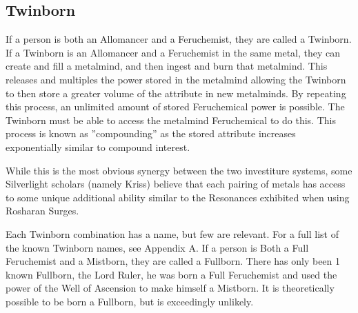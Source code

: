 \documentclass[conference]{IEEEtran}
\begin{document}
\subsection*{\textbf{Twinborn}}
If a person is both an Allomancer and a Feruchemist, they are called a Twinborn.\cite{AoL-CH1}    
If a Twinborn is an Allomancer and a Feruchemist in the same metal, they can create and fill a metalmind, and then ingest and burn that metalmind.  This releases and multiples the power stored in the metalmind allowing the Twinborn to then store a greater volume of the attribute in new metalminds.  By repeating this process, an unlimited amount of stored Feruchemical power is possible.\cite{AoL-CH11}  The Twinborn must be able to access the metalmind Feruchemical to do this.\cite{TFE-CH29}  This process is known as ''compounding'' as the stored attribute increases exponentially similar to compound interest.\cite{AoL-CH11}

While this is the most obvious synergy between the two investiture systems, some Silverlight scholars (namely Kriss) believe that each pairing of metals has access to some unique additional ability similar to the Resonances exhibited when using Rosharan Surges.\cite{ARS}

Each Twinborn combination has a name, but few are relevant.  For a full list of the known Twinborn names, see Appendix A.\cite{MBARPG}
If a person is Both a Full Feruchemist and a Mistborn, they are called a Fullborn.\cite{fullborn}  There has only been 1 known Fullborn, the Lord Ruler, he was born a Full Feruchemist\cite{TFE-EP} and used the power of the Well of Ascension to make himself a Mistborn.\cite{well-mistborn} 
It is theoretically possible to be born a Fullborn, but is exceedingly  unlikely.\cite{bornfull}
\end{document}
